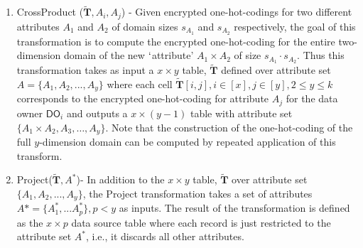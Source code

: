 \begin{enumerate}

	\item \textsf{CrossProduct} ($\tilde{\mathbf{T}}, A_i, A_j$) - Given encrypted one-hot-codings for two different attributes $A_1$ and $A_2$ of domain sizes $s_{A_1}$ and $s_{A_2}$ respectively, the goal of this transformation is to compute the encrypted one-hot-coding for the entire two-dimension domain of the new $\lq$attribute' $A_1\times A_2$ of size $s_{A_1}\cdot s_{A_2}$. Thus this transformation takes as input a $x \times y $ table, $\tilde{\mathbf{T}}$ defined over attribute set $A=\{A_1,A_2,...,A_y\}$ where each cell $\tilde{\mathbf{T}}[i,j] , i \in [x], j \in [y], 2 \leq y \leq k$ corresponds to the encrypted one-hot-coding for attribute $A_j$ for the data owner $\textsf{DO}_i$ and outputs a $x \times (y-1)$ table with attribute set $\{A_1\times A_2,A_3,\ldots,A_{y}\}$.  Note that the construction of the one-hot-coding of the full $y$-dimension domain can be computed by repeated application of this transform. 	
    
	
	\item \textsf{Project}($\tilde{\mathbf{T}},A^*$)- In addition to the $ x \times y$ table, $\tilde{\mathbf{T}}$ over attribute set $\{A_1, A_2, ..., A_y\}$, the \textsf{Project} transformation takes a set of attributes $A*=\{A^*_1,...A^*_p\}, p < y$ as inputs. The result of the transformation is defined as the $x \times p$ data source table where each record is just restricted to the attribute set $A^*$, i.e., it discards all other attributes. 
   

\end{enumerate}
